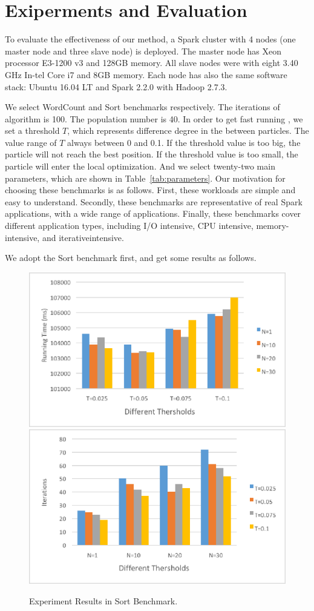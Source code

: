 \section{Exiperments and Evaluation}\label{sec:evaluation}
\par  To evaluate the effectiveness of our method, a Spark cluster with 4 nodes (one master node and three slave node) is deployed. The master node has Xeon processor E3-1200 v3 and 128GB memory. All slave nodes were with eight 3.40 GHz In-tel Core i7 and 8GB memory. Each node has also the same software stack: Ubuntu 16.04 LT and Spark 2.2.0 with Hadoop 2.7.3. 
\par We select WordCount and Sort benchmarks respectively. The iterations of algorithm is 100. The population number is 40. In order to get fast running , we set a threshold $T$, which represents difference degree in the between particles.  The value range of $T$ always between 0 and 0.1. If the threshold value is too big,  the particle will not reach the best position. If the threshold value is too small, the particle will enter the local optimization. And we select twenty-two main parameters, which are shown in Table~\ref{tab:parameters}. Our motivation for choosing these benchmarks is as follows. First, these workloads are simple and easy to understand. Secondly, these benchmarks are representative of real Spark applications, with a wide range of applications. Finally, these benchmarks cover different application types, including I/O intensive, CPU intensive, memory-intensive, and iterativeintensive.
\par We adopt the Sort benchmark first, and get some results as follows. 
\begin{figure}[!htbp]
	\centering
	{\includegraphics[width=0.48\linewidth]{SortRunningTime.eps}}
	{\includegraphics[width=0.48\linewidth]{SortIterations.eps}}\\
	\centering
	\caption{Experiment Results in Sort Benchmark.}
	\vspace{5mm}
	\label{fig:sortcompare}
\end{figure}
